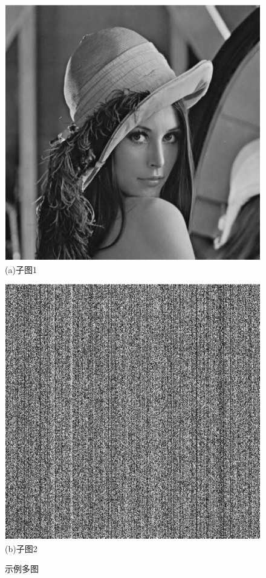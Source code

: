 \documentclass[GBK,UTF8,12pt,oneside,a4paper]{ctexbook}
\begin{document}
\begin{figure}[!htb]
\centering
\begin{minipage}[t]{\twoimage}
\centering
\includegraphics[width=\twoimage]{Lenna.pdf}
{\songti{} (a)子图1}
\end{minipage} \hspace{4pt}
\begin{minipage}[t]{\twoimage}
\centering
\includegraphics[width=\twoimage]{Lenna_e.pdf}
{\songti{} (b)子图2}
\end{minipage}
\setlength{\abovecaptionskip}{6pt} %
\setlength{\belowcaptionskip}{12pt} %
\caption{ 示例多图}
\label{fig:APairPlaintext}
\end{figure}
\end{document}
